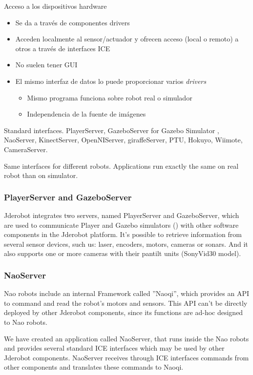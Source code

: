 \documentclass[twocolumn]{svjour3}          %
\begin{document}
Acceso a los dispositivos hardware
\begin{itemize}
\item Se da a través de {componentes drivers}
\item Acceden localmente al sensor/actuador y ofrecen acceso (local o remoto) a otros a través de interfaces ICE
\item No suelen tener GUI
\item El mismo interfaz de datos lo puede proporcionar varios \textit{drivers}
\begin{itemize}
\item Mismo programa funciona sobre robot real o simulador
\item Independencia de la fuente de imágenes
\end{itemize}
\end{itemize}


Standard interfaces. 
PlayerServer, GazeboServer for Gazebo Simulator , NaoServer, KinectServer, OpenNIServer, giraffeServer, PTU, Hokuyo, Wiimote, CameraServer.

Same interfaces for different robots.
Applications run exactly the same on real robot than on simulator. 

\subsubsection{PlayerServer and GazeboServer}
\label{subsec:gazeboserver}

Jderobot integrates two servers, named PlayerServer and GazeboServer, which are used to communicate Player and Gazebo simulators (\cite{koening2004}) with other software components in the Jderobot platform. It's possible to retrieve information from several sensor devices, such us: laser, encoders, motors, cameras or sonars. And it also supports one or more cameras with their pantilt units (SonyVid30 model).

\subsubsection{NaoServer}

Nao robots include an internal Framework called ''Naoqi'', which provides an API to command and read the robot's motors and sensors. This API can't be directly deployed by other Jderobot components, since its functions are ad-hoc designed to Nao robots.

We have created an application called NaoServer, that runs inside the Nao robots and provides several standard ICE interfaces which may be used by other Jderobot components. NaoServer receives through ICE interfaces commands from other components and translates these commands to Naoqi.
\end{document}
